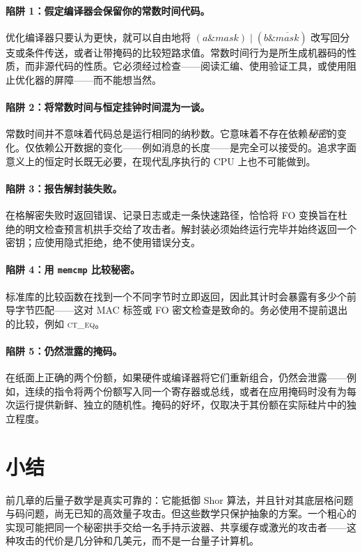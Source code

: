 \paragraph{陷阱 1：假定编译器会保留你的常数时间代码。}
优化编译器只要认为更快，就可以自由地将 $(a \mathbin{\&} mask)\mathbin{|}(b
\mathbin{\&}\overline{mask})$ 改写回分支或条件传送，或者让带掩码的比较短路求值。常数时间行为是所生成机器码的性质，而非源代码的性质。它必须经过检查——阅读汇编、使用验证工具，或使用阻止优化器的屏障——而不能想当然。

\paragraph{陷阱 2：将常数时间与恒定挂钟时间混为一谈。}
常数时间并不意味着代码总是运行相同的纳秒数。它意味着不存在依赖\emph{秘密}的变化。仅依赖公开数据的变化——例如消息的长度——是完全可以接受的。追求字面意义上的恒定时长既无必要，在现代乱序执行的 CPU 上也不可能做到。

\paragraph{陷阱 3：报告解封装失败。}
在格解密失败时返回错误、记录日志或走一条快速路径，恰恰将 FO 变换旨在杜绝的明文检查预言机拱手交给了攻击者。解封装必须始终运行完毕并始终返回一个密钥；应使用隐式拒绝，绝不使用错误分支。

\paragraph{陷阱 4：用 \texttt{memcmp} 比较秘密。}
标准库的比较函数在找到一个不同字节时立即返回，因此其计时会暴露有多少个前导字节匹配——这对 MAC 标签或 FO 密文检查是致命的。务必使用不提前退出的比较，例如 \textsc{ct\_eq}。

\paragraph{陷阱 5：仍然泄露的掩码。}
在纸面上正确的两个份额，如果硬件或编译器将它们重新组合，仍然会泄露——例如，连续的指令将两个份额写入同一个寄存器或总线，或者在应用掩码时没有为每次运行提供新鲜、独立的随机性。掩码的好坏，仅取决于其份额在实际硅片中的独立程度。

\section{小结}

前几章的后量子数学是真实可靠的：它能抵御 Shor 算法，并且针对其底层格问题与码问题，尚无已知的高效量子攻击。但这些数学只保护抽象的方案。一个粗心的实现可能把同一个秘密拱手交给一名手持示波器、共享缓存或激光的攻击者——这种攻击的代价是几分钟和几美元，而不是一台量子计算机。

